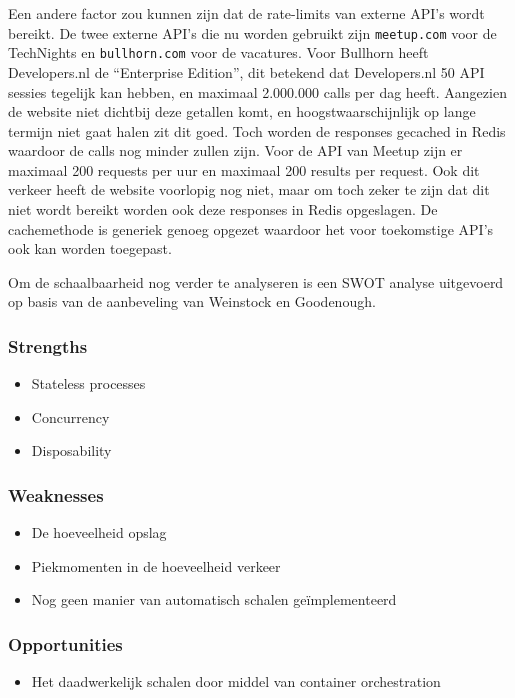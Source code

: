 Een andere factor zou kunnen zijn dat de rate-limits van externe API's wordt bereikt. De twee externe API's die nu worden gebruikt zijn \texttt{meetup.com} voor de TechNights en \texttt{bullhorn.com} voor de vacatures. Voor Bullhorn heeft Developers.nl de \enquote{Enterprise Edition}, dit betekend dat Developers.nl 50 API sessies tegelijk kan hebben, en maximaal 2.000.000 calls per dag heeft. Aangezien de website niet dichtbij deze getallen komt, en hoogstwaarschijnlijk op lange termijn niet gaat halen zit dit goed. Toch worden de responses gecached in Redis waardoor de calls nog minder zullen zijn. Voor de API van Meetup zijn er maximaal 200 requests per uur en maximaal 200 results per request. Ook dit verkeer heeft de website voorlopig nog niet, maar om toch zeker te zijn dat dit niet wordt bereikt worden ook deze responses in Redis opgeslagen. De cachemethode is generiek genoeg opgezet waardoor het voor toekomstige API's ook kan worden toegepast.

Om de schaalbaarheid nog verder te analyseren is een SWOT analyse uitgevoerd op basis van de aanbeveling van Weinstock en Goodenough.

\subsubsection{Strengths}
\begin{itemize}
	\item Stateless processes
	\item Concurrency
	\item Disposability
\end{itemize}

\subsubsection{Weaknesses}
\begin{itemize}
	\item De hoeveelheid opslag
	\item Piekmomenten in de hoeveelheid verkeer
	\item Nog geen manier van automatisch schalen geïmplementeerd
\end{itemize}

\subsubsection{Opportunities}
\begin{itemize}
	\item Het daadwerkelijk schalen door middel van container orchestration
\end{itemize}

